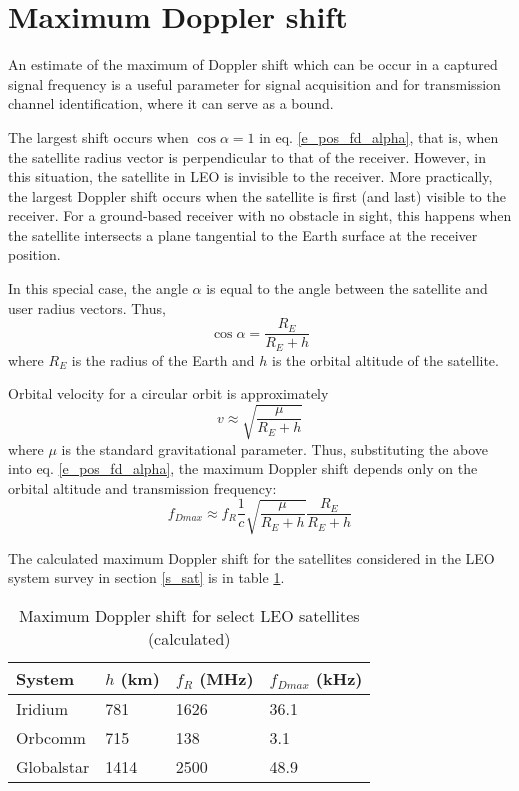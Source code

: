 \section{Maximum Doppler shift}
An estimate of the maximum of Doppler shift which can be occur in a captured signal frequency is a useful parameter for signal acquisition and for transmission channel identification, where it can serve as a bound.

The largest shift occurs when $\cos{\alpha} = 1$ in eq. \ref{e_pos_fd_alpha}, that is, when the satellite radius vector is perpendicular to that of the receiver. However, in this situation, the satellite in LEO is invisible to the receiver. More practically, the largest Doppler shift occurs when the satellite is first (and last) visible to the receiver. For a ground-based receiver with no obstacle in sight, this happens when the satellite intersects a plane tangential to the Earth surface at the receiver position.

In this special case, the angle $\alpha$ is equal to the angle between the satellite and user radius vectors. Thus,
\begin{equation*}
    \cos{\alpha} = \frac{R_E}{R_E + h}
\end{equation*}
where $R_E$ is the radius of the Earth and $h$ is the orbital altitude of the satellite.

Orbital velocity for a circular orbit is approximately
\begin{equation*}
    v \approx \sqrt{\frac{\mu}{R_E + h}}
\end{equation*}
where $\mu$ is the standard gravitational parameter. Thus, substituting the above into eq. \ref{e_pos_fd_alpha}, the maximum Doppler shift depends only on the orbital altitude and transmission frequency:
\begin{equation}
    \label{e_pos_fd_max}
    f_{D max} \approx f_R \frac{1}{c} \sqrt{\frac{\mu}{R_E + h}} \frac{R_E}{R_E + h}
\end{equation}

The calculated maximum Doppler shift for the satellites considered in the LEO system survey in section \ref{s_sat} is in table \ref{t_pos_max_fd}.

\begin{table}
    \centering
    \begin{tabular}{llll}
    System     & $h$ (km) &  $f_R$ (MHz) & $f_{Dmax}$ (kHz) \\ \hline
    Iridium    &  781  &  1626 & \num{36.1} \\
    Orbcomm    &  715  &  138  & \num{3.1} \\
    Globalstar &  1414 &  2500 & \num{48.9}
    \end{tabular}
    \caption{Maximum Doppler shift for select LEO satellites (calculated)}
    \label{t_pos_max_fd}
\end{table}



